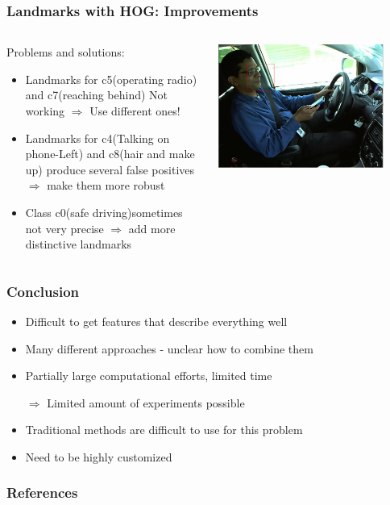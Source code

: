\documentclass{beamer}
\begin{document}
	\begin{frame}
		\frametitle{Landmarks with HOG: Improvements}		
		\begin{columns}
			\begin{column}{0.5\textwidth}
				Problems and solutions:
				\begin{itemize}
					\item Landmarks for c5(operating radio) and c7(reaching behind) Not working $\Rightarrow$ Use different ones!
					\item Landmarks for c4(Talking on phone-Left) and c8(hair and make up) produce several false positives $\Rightarrow$ make them more robust
					\item Class c0(safe driving)sometimes not very precise $\Rightarrow$ add more distinctive landmarks
				\end{itemize}
			\end{column}
			\begin{column}{0.5\textwidth}
				\begin{center}
					\includegraphics[width=0.85\textwidth]{mult_HOG/talk_phone_left}
				\end{center}
			\end{column}
		\end{columns}
		
	\end{frame}
	
	\begin{frame}
		\frametitle{Conclusion}		
		\begin{itemize}
			\item Difficult to get features that describe everything well
			\item Many different approaches - unclear how to combine them
			\item Partially large computational efforts, limited time
			\item[$\Rightarrow$] Limited amount of experiments possible
			\vspace{0.5cm}
			\item Traditional methods are difficult to use for this problem
			\item Need to be highly customized
		\end{itemize}
	\end{frame}
	
	

    
	\begin{frame}[allowframebreaks]
		\frametitle{References} 
		\nocite{*} 
		 
		 
	\end{frame}

	\medskip
\end{document}
